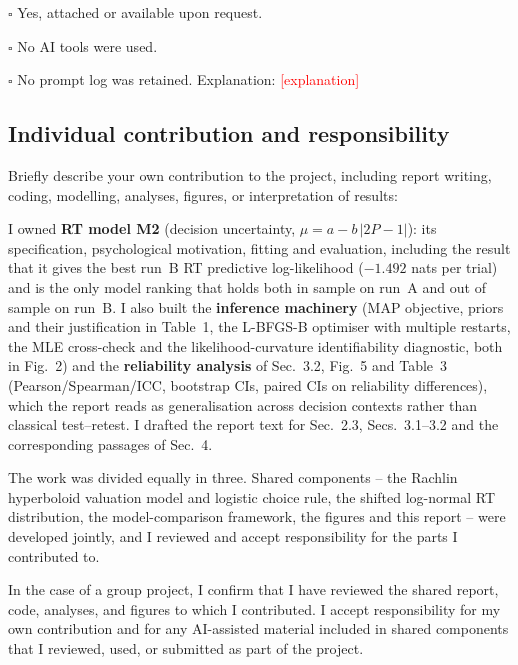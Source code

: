 \documentclass[11pt]{article}
\newcommand{\fillme}[1]{\textcolor{red}{[#1]}}
\begin{document}
\noindent
$\square$ Yes, attached or available upon request.

\noindent
$\square$ No AI tools were used.

\noindent
$\square$ No prompt log was retained. Explanation:
\fillme{explanation}

\bigskip

\subsection*{Individual contribution and responsibility}

\noindent
Briefly describe your own contribution to the project, including report writing,
coding, modelling, analyses, figures, or interpretation of results:

\medskip

\noindent
I owned \textbf{RT model M2} (decision uncertainty, $\mu = a - b\,|2P-1|$): its
specification, psychological motivation, fitting and evaluation, including the
result that it gives the best run~B RT predictive log-likelihood ($-1.492$ nats
per trial) and is the only model ranking that holds both in sample on run~A and
out of sample on run~B. I also built the \textbf{inference machinery} (MAP
objective, priors and their justification in Table~1, the L-BFGS-B optimiser with
multiple restarts, the MLE cross-check and the likelihood-curvature
identifiability diagnostic, both in Fig.~2) and the \textbf{reliability analysis}
of Sec.~3.2, Fig.~5 and Table~3 (Pearson/Spearman/ICC, bootstrap CIs, paired CIs
on reliability differences), which the report reads as generalisation across
decision contexts rather than classical test--retest. I drafted the report text
for Sec.~2.3, Secs.~3.1--3.2 and the corresponding passages of Sec.~4.

\medskip

\noindent
The work was divided equally in three. Shared components -- the Rachlin
hyperboloid valuation model and logistic choice rule, the shifted log-normal RT
distribution, the model-comparison framework, the figures and this report -- were
developed jointly, and I reviewed and accept responsibility for the parts I
contributed to.

\bigskip

\noindent
In the case of a group project, I confirm that I have reviewed the shared report,
code, analyses, and figures to which I contributed. I accept responsibility for my
own contribution and for any AI-assisted material included in shared components
that I reviewed, used, or submitted as part of the project.
\end{document}
